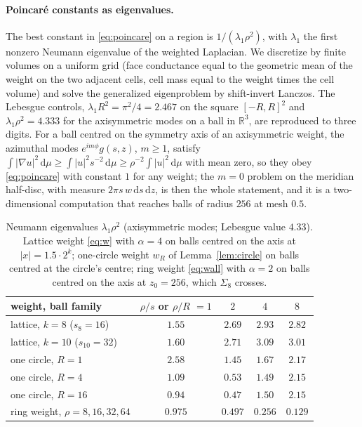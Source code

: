 \documentclass[11pt]{amsart}
\newcommand{\R}{\mathbb{R}}
\newcommand{\dd}{\,\mathrm{d}}
\newcommand{\abs}[1]{\lvert #1\rvert}
\theoremstyle{plain}
\theoremstyle{definition}
\theoremstyle{remark}
\begin{document}
\paragraph{Poincar\'e constants as eigenvalues.}
The best constant in \eqref{eq:poincare} on a region is $1/(\lambda_1\rho^2)$,
with $\lambda_1$ the first nonzero Neumann eigenvalue of the weighted Laplacian.
We discretize by finite volumes on a uniform grid (face conductance equal to
the geometric mean of the weight on the two adjacent cells, cell mass equal to
the weight times the cell volume) and solve the generalized eigenproblem by
shift-invert Lanczos. The Lebesgue controls, $\lambda_1R^2=\pi^2/4=2.467$ on the
square $[-R,R]^2$ and $\lambda_1\rho^2=4.333$ for the axisymmetric modes on a
ball in $\R^3$, are reproduced to three digits. For a ball centred on the
symmetry axis of an axisymmetric weight, the azimuthal modes $e^{im\phi}g(s,z)$,
$m\ge1$, satisfy $\int\abs{\nabla u}^2\dd\mu\ge\int\abs{u}^2s^{-2}\dd\mu\ge
\rho^{-2}\int\abs u^2\dd\mu$ with mean zero, so they obey \eqref{eq:poincare}
with constant $1$ for any weight; the $m=0$ problem on the meridian half-disc,
with measure $2\pi s\,w\dd s\dd z$, is then the whole statement, and it is a
two-dimensional computation that reaches balls of radius $256$ at mesh $0.5$.

\begin{table}[t]
\caption{Neumann eigenvalues $\lambda_1\rho^2$ (axisymmetric modes; Lebesgue
value $4.33$). Lattice weight \eqref{eq:w} with $\alpha=4$ on balls centred on
the axis at $\abs x=1.5\cdot2^k$; one-circle weight $w_R$ of
Lemma~\ref{lem:circle} on balls centred at the circle's centre; ring weight
\eqref{eq:wall} with $\alpha=2$ on balls centred on the axis at $z_0=256$,
which $\Sigma_8$ crosses.}
\label{tab:eigen}
\small
\begin{tabular}{@{}lcccc@{}}
\toprule
weight, ball family & $\rho/s$ or $\rho/R$ $=1$ & $2$ & $4$ & $8$ \\
\midrule
lattice, $k=8$ ($s_8=16$) & $1.55$ & $2.69$ & $2.93$ & $2.82$ \\
lattice, $k=10$ ($s_{10}=32$) & $1.60$ & $2.71$ & $3.09$ & $3.01$ \\
one circle, $R=1$ & $2.58$ & $1.45$ & $1.67$ & $2.17$ \\
one circle, $R=4$ & $1.09$ & $0.53$ & $1.49$ & $2.15$ \\
one circle, $R=16$ & $0.94$ & $0.47$ & $1.50$ & $2.15$ \\
ring weight, $\rho=8,16,32,64$ & $0.975$ & $0.497$ & $0.256$ & $0.129$ \\
\bottomrule
\end{tabular}
\end{table}
\end{document}
